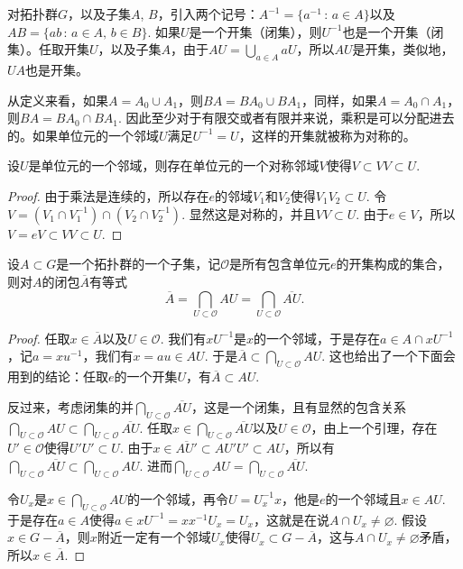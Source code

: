对拓扑群$G$，以及子集$A$, $B$，引入两个记号：$A^{-1}=\{a^{-1}\,:\,a\in A\}$以及$AB=\{ab\,:\,a\in A,\, b\in B\}$. 如果$U$是一个开集（闭集），则$U^{-1}$也是一个开集（闭集）。任取开集$U$，以及子集$A$，由于$AU=\bigcup_{a\in A}aU$，所以$AU$是开集，类似地，$UA$也是开集。

从定义来看，如果$A=A_0\cup A_1$，则$BA=BA_0\cup BA_1$，同样，如果$A=A_0\cap A_1$，则$BA=BA_0\cap BA_1$. 因此至少对于有限交或者有限并来说，乘积是可以分配进去的。如果单位元的一个邻域$U$满足$U^{-1}=U$，这样的开集就被称为对称的。

\begin{lem}
设$U$是单位元的一个邻域，则存在单位元的一个对称邻域$V$使得$V\subset VV\subset U$. 
\end{lem}

\begin{proof}
	由于乘法是连续的，所以存在$e$的邻域$V_1$和$V_2$使得$V_1V_2\subset U$. 令$V=(V_1\cap V_1^{-1})\cap (V_2\cap V_2^{-1})$. 显然这是对称的，并且$VV\subset U$. 由于$e\in V$，所以$V=eV\subset VV\subset U$.
\end{proof}

\begin{lem}\label{lem:2}
设$A\subset G$是一个拓扑群的一个子集，记$\mathscr{O}$是所有包含单位元$e$的开集构成的集合，则对$A$的闭包$\overline{A}$有等式
\[
	\overline{A}=\bigcap_{U\subset \mathscr{O}}AU=\bigcap_{U\subset \mathscr{O}}\overline{AU}.
\]
\end{lem}

\begin{proof}
	任取$x\in \overline{A}$以及$U\in \mathscr{O}$. 我们有$xU^{-1}$是$x$的一个邻域，于是存在$a\in A\cap x U^{-1}$，记$a=xu^{-1}$，我们有$x=au\in AU$. 于是$\overline{A}\subset \bigcap_{U\subset \mathscr{O}}AU$. 这也给出了一个下面会用到的结论：任取$e$的一个开集$U$，有$\overline{A}\subset AU$.

	反过来，考虑闭集的并$\bigcap_{U\subset \mathscr{O}}\overline{AU}$，这是一个闭集，且有显然的包含关系$\bigcap_{U\subset \mathscr{O}}AU\subset \bigcap_{U\subset \mathscr{O}}\overline{AU}$. 任取$x\in \bigcap_{U\subset \mathscr{O}}\overline{AU}$以及$U\in \mathscr{O}$，由上一个引理，存在$U'\in \mathscr{O}$使得$U'U'\subset U$. 由于$x\in \overline{AU'}\subset AU'U'\subset AU$，所以有$\bigcap_{U\subset \mathscr{O}}\overline{AU}\subset \bigcap_{U\subset \mathscr{O}}AU$. 进而$\bigcap_{U\subset \mathscr{O}}AU=\bigcap_{U\subset \mathscr{O}}\overline{AU}$.

	令$U_x$是$x\in \bigcap_{U\subset \mathscr{O}}AU$的一个邻域，再令$U=U_x^{-1}x$，他是$e$的一个邻域且$x\in AU$. 于是存在$a\in A$使得$a\in xU^{-1}=xx^{-1}U_x=U_x$，这就是在说$A\cap U_x\neq \varnothing$. 假设$x\in G-\overline{A}$，则$x$附近一定有一个邻域$U_x$使得$U_x\subset G-\overline{A}$，这与$A\cap U_x\neq \varnothing$矛盾，所以$x\in \overline{A}$.
\end{proof}

